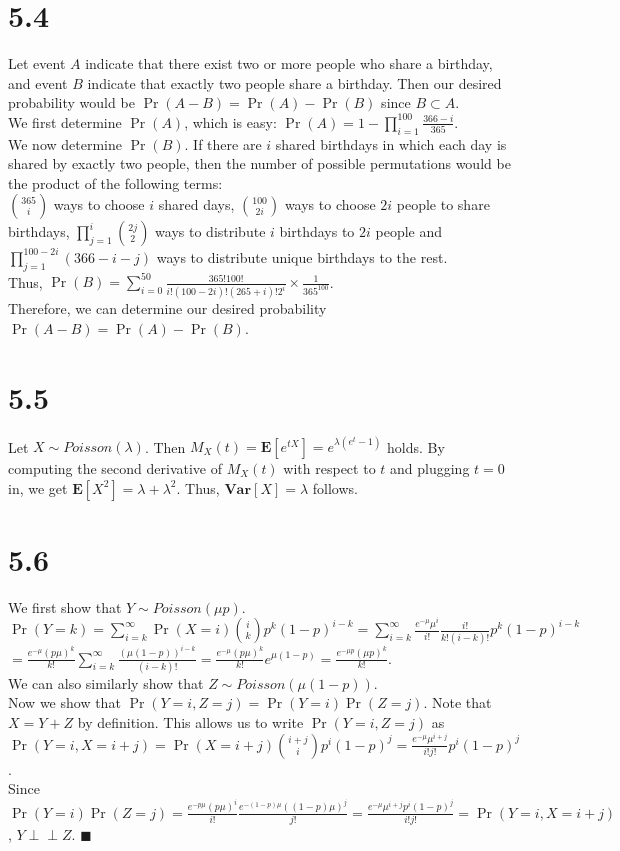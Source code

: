 \documentclass{article}
\begin{document}
\section*{5.4}
Let event $A$ indicate that there exist two or more people who share a birthday, and event $B$ indicate that exactly two people share a birthday.
Then our desired probability would be $\Pr(A-B)=\Pr(A)-\Pr(B)$ since $B\subset A$.\\
We first determine $\Pr(A)$, which is easy: $\Pr(A)=1-\prod\limits_{i=1}^{100}\frac{366-i}{365}$.\\
We now determine $\Pr(B)$. If there are $i$ shared birthdays in which each day is shared by exactly two people, then the number of possible permutations would be the product of the following terms:\\
$\binom{365}{i}$ ways to choose $i$ shared days, 
$\binom{100}{2i}$ ways to choose $2i$ people to share birthdays,
$\prod\limits_{j=1}^i\binom{2j}{2}$ ways to distribute $i$ birthdays to $2i$ people
and $\prod\limits_{j=1}^{100-2i}(366-i-j)$ ways to distribute unique birthdays to the rest.\\
Thus, $\Pr(B)=\sum\limits_{i=0}^{50}\frac{365!100!}{i!(100-2i)!(265+i)!2^i}\times\frac{1}{365^{100}}$.\\
Therefore, we can determine our desired probability $\Pr(A-B)=\Pr(A)-\Pr(B)$.
\section*{5.5}
Let $X\sim Poisson(\lambda)$. Then $M_X(t)=\textbf{E}[e^{tX}]=e^{\lambda(e^t-1)}$ holds.
By computing the second derivative of $M_X(t)$ with respect to $t$ and plugging $t=0$ in, we get $\textbf{E}[X^2]=\lambda+\lambda^2$.
Thus, $\textbf{Var}[X]=\lambda$ follows.
\section*{5.6}
We first show that $Y\sim Poisson(\mu p)$.\\
$\Pr(Y=k)=\sum\limits_{i=k}^\infty\Pr(X=i)\binom{i}{k}p^k(1-p)^{i-k}=\sum\limits_{i=k}^\infty\frac{e^{-\mu}\mu^i}{i!}\frac{i!}{k!(i-k)!}p^k(1-p)^{i-k}$\\
$=\frac{e^{-\mu}(p\mu)^k}{k!}\sum\limits_{i=k}^\infty\frac{(\mu(1-p))^{i-k}}{(i-k)!}=\frac{e^{-\mu}(p\mu)^k}{k!}e^{\mu(1-p)}=\frac{e^{-\mu p}(\mu p)^k}{k!}$.\\
We can also similarly show that $Z\sim Poisson(\mu(1-p))$.\\
Now we show that $\Pr(Y=i,Z=j)=\Pr(Y=i)\Pr(Z=j)$. Note that $X=Y+Z$ by definition.
This allows us to write $\Pr(Y=i,Z=j)$ as $\Pr(Y=i,X=i+j)=\Pr(X=i+j)\binom{i+j}{i}p^{i}(1-p)^{j}=\frac{e^{-\mu}\mu^{i+j}}{i!j!}p^i(1-p)^j$.\\
Since $\Pr(Y=i)\Pr(Z=j)=\frac{e^{-p\mu}(p\mu)^i}{i!}\frac{e^{-(1-p)\mu}((1-p)\mu)^j}{j!}=\frac{e^{-\mu}\mu^{i+j}p^i(1-p)^j}{i!j!}=\Pr(Y=i,X=i+j)$,
$Y \perp\!\!\!\perp Z$. $\blacksquare$
\end{document}
